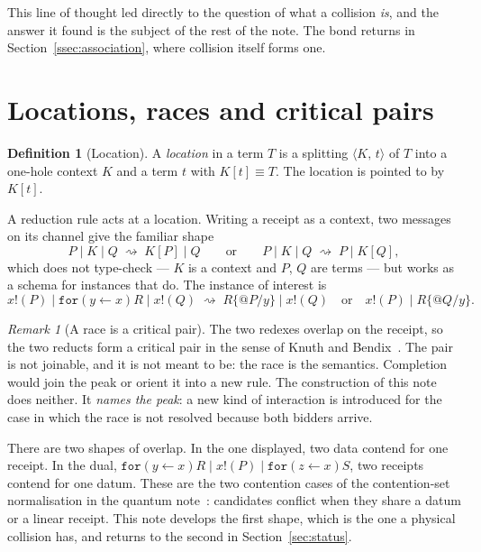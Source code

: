 \documentclass[11pt,a4paper]{article}
\theoremstyle{plain}
\theoremstyle{definition}
\newtheorem{definition}[theorem]{Definition}
\theoremstyle{remark}
\newtheorem{remark}[theorem]{Remark}
\newcommand{\scong}{\equiv}
\newcommand{\red}{\rightsquigarrow}
\newcommand{\loc}[2]{\langle #1,\, #2\rangle}
\newcommand{\code}[1]{\texttt{#1}}
\begin{document}
This line of thought led directly to the question of what a collision
\emph{is}, and the answer it found is the subject of the rest of the note. The
bond returns in Section~\ref{ssec:association}, where collision itself forms
one.

\section{Locations, races and critical pairs}\label{sec:locations}

\begin{definition}[Location]\label{def:location}
A \emph{location} in a term $T$ is a splitting $\loc{K}{t}$ of $T$ into a
one-hole context $K$ and a term $t$ with $K[t]\scong T$. The location is
pointed to by $K[t]$.
\end{definition}

A reduction rule acts at a location. Writing a receipt as a context, two
messages on its channel give the familiar shape
\[
P \mid K \mid Q \;\red\; K[P] \mid Q
\qquad\text{or}\qquad
P \mid K \mid Q \;\red\; P \mid K[Q] ,
\]
which does not type-check --- $K$ is a context and $P$, $Q$ are terms --- but
works as a schema for instances that do. The instance of interest is
\[
x!(P) \mid \code{for}(y\leftarrow x)R \mid x!(Q)
\;\red\; R\{@P/y\} \mid x!(Q)
\quad\text{or}\quad
x!(P) \mid R\{@Q/y\} .
\]

\begin{remark}[A race is a critical pair]\label{rem:critical}
The two redexes overlap on the receipt, so the two reducts form a critical pair
in the sense of Knuth and Bendix~\cite{KB}. The pair is not joinable, and it is
not meant to be: the race is the semantics. Completion would join the peak or
orient it into a new rule. The construction of this note does neither. It
\emph{names the peak}: a new kind of interaction is introduced for the case in
which the race is not resolved because both bidders arrive.
\end{remark}

There are two shapes of overlap. In the one displayed, two data contend for
one receipt. In the dual, $\code{for}(y\leftarrow x)R \mid x!(P) \mid
\code{for}(z\leftarrow x)S$, two receipts contend for one datum. These are the
two contention cases of the contention-set normalisation in the quantum
note~\cite{GWQ}: candidates conflict when they share a datum or a linear
receipt. This note develops the first shape, which is the one a physical
collision has, and returns to the second in Section~\ref{sec:status}.
\end{document}
